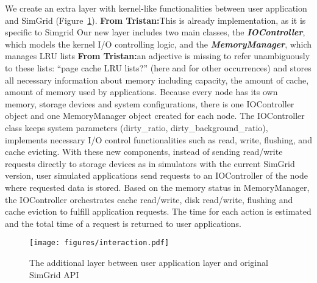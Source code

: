 \documentclass[conference]{IEEEtran}
\newcommand{\tristan}[1]{\color{orange}\textbf{From Tristan:}#1\color{black}}
\begin{document}
			We create an extra layer with kernel-like functionalities
			between user application and SimGrid (Figure~\ref{fig:interaction}). \tristan{This is already implementation, as it is specific to Simgrid}
			Our new layer includes two main
			classes, the \textbf{\textit{IOController}},
			which models the kernel I/O controlling logic, and the
			\textbf{\textit{MemoryManager}}, which manages LRU lists \tristan{an adjective is missing to refer unambiguously to these lists: ``page cache LRU lists?'' (here and 
			for other occurrences)} and stores all
			necessary information about memory including capacity, the
			amount of cache, amount of memory used by applications. Because every node has its own memory,
			storage devices and system configurations, there is one
			IOController object and one MemoryManager object created for
			each node. The IOController class keeps system parameters
			(dirty{\_}ratio, dirty{\_}background{\_}ratio), implements
			necessary I/O control functionalities such as read, write,
			flushing, and cache evicting. With these new components,
			instead of sending read/write requests directly to storage
			devices as in simulators with the current SimGrid version, user
			simulated applications send requests to an IOController of the
			node where requested data is stored. Based on the memory status
			in MemoryManager, the IOController orchestrates cache
			read/write, disk read/write, flushing and cache eviction to
			fulfill application requests. The time for each action is
			estimated and the total time of a request is returned to user
			applications.
		
				
			\begin{figure}
   				\centering
   				\texttt{[image: figures/interaction.pdf]}
   				\caption{The additional layer between user application layer and original SimGrid API}\label{fig:interaction}
			\end{figure}
			
\end{document}
